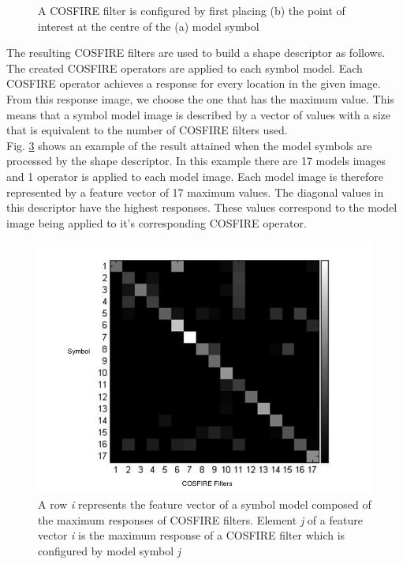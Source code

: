 \begin{figure}[h]
\begin{subfigure}[b]{0.3\textwidth}
                \caption{}
                \label{fig:cosfireconf}
        \end{subfigure}
        \caption[Configuration of a COSFIRE filter using single point approach]{A COSFIRE filter is configured by first placing (b) the point of interest at the centre of the (a) model symbol}
        \label{fig:COSFIREoperatorExample}
\end{figure}

The resulting COSFIRE filters are used to build a shape descriptor as follows. The created COSFIRE operators are applied to each symbol model. Each COSFIRE operator achieves a response for every location in the given image. From this response image, we choose the one that has the maximum value. This means that a symbol model image is described by a vector of values with a size that is equivalent to the number of COSFIRE filters used.\\

Fig. \ref{fig:shapedescriptor} shows an example of the result attained when the model symbols are processed by the shape descriptor. In this example there are 17 models images and 1 operator is applied to each model image. Each model image is therefore represented by a feature vector of 17 maximum values. The diagonal values in this descriptor have the highest responses. These values correspond to the model image being applied to it's corresponding COSFIRE operator.\\

\begin{figure}[h]
    \centering
    \includegraphics[totalheight=0.5\textheight, keepaspectratio]{figures/Method/ShapeDescriptor2.png}
    \caption[Example of the feature vectors  for each model created by a shape descriptor]{A row {\em i} represents the feature vector of a symbol model composed of the maximum responses of COSFIRE filters. Element {\em j} of a feature vector {\em i} is the maximum response of a COSFIRE filter which is configured by model symbol {\em j}}
    \label{fig:shapedescriptor}
  \end{figure}

